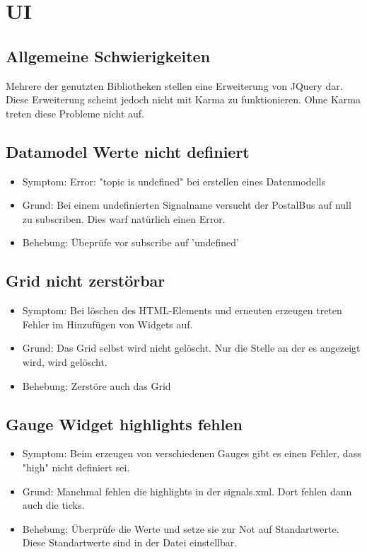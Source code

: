\documentclass[qualitaetssicherung.tex]{subfiles}
\begin{document}
\section{UI}

	\subsection{Allgemeine Schwierigkeiten}
		Mehrere der genutzten Bibliotheken stellen eine Erweiterung von JQuery dar. Diese Erweiterung scheint jedoch nicht mit Karma zu funktionieren. Ohne Karma treten diese Probleme nicht auf.

	\subsection{Datamodel Werte nicht definiert}
		\begin{itemize}
			\item
			Symptom: Error: "topic is undefined" bei erstellen eines Datenmodells
			\item
			Grund: Bei einem undefinierten Signalname versucht der PostalBus auf null zu subscriben. Dies warf natürlich einen Error.
			\item
			Behebung: Übeprüfe vor subscribe auf 'undefined'
		\end{itemize}
		
	\subsection{Grid nicht zerstörbar}
		\begin{itemize}
			\item
			Symptom: Bei löschen des HTML-Elements und erneuten erzeugen treten Fehler im Hinzufügen von Widgets auf. 
			\item
			Grund: Das Grid selbst wird nicht gelöscht. Nur die Stelle an der es angezeigt wird, wird gelöscht.
			\item
			Behebung: Zerstöre auch das Grid
		\end{itemize}
		
	\subsection{Gauge Widget highlights fehlen}
	\begin{itemize}
		\item
		Symptom: Beim erzeugen von verschiedenen Gauges gibt es einen Fehler, dass "high" nicht definiert sei.
		\item
		Grund: Manchmal fehlen die highlights in der signals.xml. Dort fehlen dann auch die ticks.
		\item
		Behebung: Überprüfe die Werte und setze sie zur Not auf Standartwerte. Diese Standartwerte sind in der Datei einstellbar.
	\end{itemize}	
	
\end{document}
